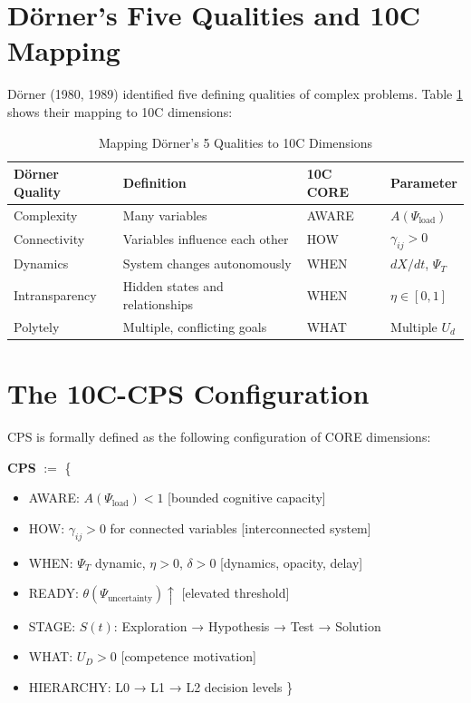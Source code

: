 \section{Dörner's Five Qualities and 10C Mapping}
\label{sec:cps-five-qualities}

Dörner (1980, 1989) identified five defining qualities of complex problems. Table \ref{tab:cps-mapping} shows their mapping to 10C dimensions:

\begin{table}[htbp]
\centering
\caption{Mapping Dörner's 5 Qualities to 10C Dimensions}
\label{tab:cps-mapping}
\begin{tabular}{llll}
\toprule
\textbf{Dörner Quality} & \textbf{Definition} & \textbf{10C CORE} & \textbf{Parameter} \\
\midrule
Complexity & Many variables & AWARE & $A(\Psi_{\text{load}})$ \\
Connectivity & Variables influence each other & HOW & $\gamma_{ij} > 0$ \\
Dynamics & System changes autonomously & WHEN & $dX/dt$, $\Psi_T$ \\
Intransparency & Hidden states and relationships & WHEN & $\eta \in [0,1]$ \\
Polytely & Multiple, conflicting goals & WHAT & Multiple $U_d$ \\
\bottomrule
\end{tabular}
\end{table}


\section{The 10C-CPS Configuration}
\label{sec:cps-configuration}

CPS is formally defined as the following configuration of CORE dimensions:

\begin{tcolorbox}[colback=gray!10!white, colframe=gray!75!black,
    title=Definition: CPS as 10C Configuration]

\textbf{CPS} $:=$ \{
\begin{itemize}[nosep]
\item AWARE: $A(\Psi_{\text{load}}) < 1$ \hfill [bounded cognitive capacity]
\item HOW: $\gamma_{ij} > 0$ for connected variables \hfill [interconnected system]
\item WHEN: $\Psi_T$ dynamic, $\eta > 0$, $\delta > 0$ \hfill [dynamics, opacity, delay]
\item READY: $\theta(\Psi_{\text{uncertainty}}) \uparrow$ \hfill [elevated threshold]
\item STAGE: $S(t)$: Exploration → Hypothesis → Test → Solution
\item WHAT: $U_D > 0$ \hfill [competence motivation]
\item HIERARCHY: L0 → L1 → L2 decision levels
\}
\end{itemize}

\end{tcolorbox}

